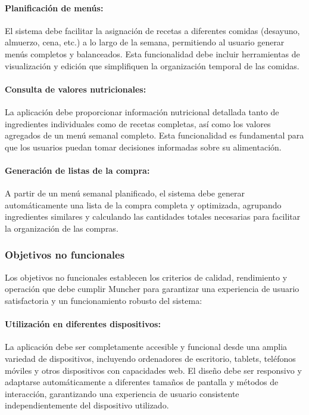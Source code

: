 \paragraph*{Planificación de menús:}
El sistema debe facilitar la asignación de recetas a diferentes comidas (desayuno, almuerzo, cena, etc.) a lo largo de la semana, permitiendo al usuario generar menús completos y balanceados. Esta funcionalidad debe incluir herramientas de visualización y edición que simplifiquen la organización temporal de las comidas.

\paragraph*{Consulta de valores nutricionales:}
La aplicación debe proporcionar información nutricional detallada tanto de ingredientes individuales como de recetas completas, así como los valores agregados de un menú semanal completo. Esta funcionalidad es fundamental para que los usuarios puedan tomar decisiones informadas sobre su alimentación.

\paragraph*{Generación de listas de la compra:}
A partir de un menú semanal planificado, el sistema debe generar automáticamente una lista de la compra completa y optimizada, agrupando ingredientes similares y calculando las cantidades totales necesarias para facilitar la organización de las compras.

\subsubsection*{Objetivos no funcionales}

Los objetivos no funcionales establecen los criterios de calidad, rendimiento y operación que debe cumplir Muncher para garantizar una experiencia de usuario satisfactoria y un funcionamiento robusto del sistema:

\paragraph{Utilización en diferentes dispositivos:}
La aplicación debe ser completamente accesible y funcional desde una amplia variedad de dispositivos, incluyendo ordenadores de escritorio, tablets, teléfonos móviles y otros dispositivos con capacidades web. El diseño debe ser responsivo y adaptarse automáticamente a diferentes tamaños de pantalla y métodos de interacción, garantizando una experiencia de usuario consistente independientemente del dispositivo utilizado.

